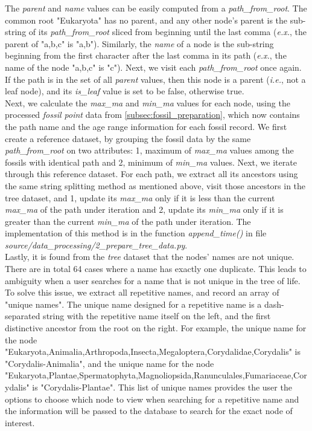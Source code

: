 \documentclass[11pt, a4paper,oneside,chapterprefix=false]{scrbook}
\begin{document}
The \emph{parent} and \emph{name} values can be easily computed from a \emph{path\_from\_root}. The common root "Eukaryota" has no parent, and any other node's parent is the sub-string of its \emph{path\_from\_root} sliced from beginning until the last comma (\emph{e.x.}, the parent of "a,b,c" is "a,b"). Similarly, the \emph{name} of a node is the sub-string beginning from the first character after the last comma in its path (\emph{e.x.}, the name of the node "a,b,c" is "c"). Next, we visit each \emph{path\_from\_root} once again. If the path is in the set of all \emph{parent} values, then this node is a parent (\emph{i.e.}, not a leaf node), and its \emph{is\_leaf} value is set to be false, otherwise true. \\

Next, we calculate the \emph{max\_ma} and \emph{min\_ma} values for each node, using the processed \emph{fossil point} data from \ref{subsec:fossil_preparation}, which now contains the path name and the age range information for each fossil record. We first create a reference dataset, by grouping the fossil data by the same \emph{path\_from\_root} on two attributes: 1, maximum of \emph{max\_ma} values among the fossils with identical path and 2, minimum of \emph{min\_ma} values. Next, we iterate through this reference dataset. For each path, we extract all its ancestors using the same string splitting method as mentioned above, visit those ancestors in the tree dataset, and 1, update its \emph{max\_ma} only if it is less than the current \emph{max\_ma} of the path under iteration and 2, update its \emph{min\_ma} only if it is greater than the current \emph{min\_ma} of the path under iteration. The implementation of this method is in the function \emph{append\_time()} in file \emph{source/data\_processing/2\_prepare\_tree\_data.py}. \\

Lastly, it is found from the \emph{tree} dataset that the nodes' names are not unique. There are in total 64 cases where a name has exactly one duplicate. This leads to ambiguity when a user searches for a name that is not unique in the tree of life. To solve this issue, we extract all repetitive names, and record an array of "unique names". The unique name designed for a repetitive name is a dash-separated string with the repetitive name itself on the left, and the first distinctive ancestor from the root on the right. For example, the unique name for the node "Eukaryota,Animalia,Arthropoda,Insecta,Megaloptera,Corydalidae,Corydalis" is "Corydalis-Animalia", and the unique name for the node "Eukaryota,Plantae,Spermatophyta,Magnoliopsida,Ranunculales,Fumariaceae,Corydalis" is "Corydalis-Plantae". This list of unique names provides the user the options to choose which node to view when searching for a repetitive name and the information will be passed to the database to search for the exact node of interest.
\end{document}
